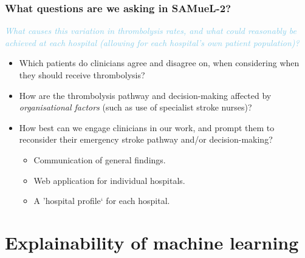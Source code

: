 \documentclass[xcolor={usenames,dvipsnames}]{beamer}
\newcommand{\smallurl}[1]{\textcolor{blue}{\fontsize{4pt}{4.8pt}\selectfont \url{#1}}}
\begin{document}
\begin{frame}
\frametitle{What questions are we asking in SAMueL-2?}


\textcolor{SkyBlue}{\emph{What causes this variation in thrombolysis rates, and what could reasonably be achieved at each hospital (allowing for each hospital's own patient population)?}}

\vspace{1em}

\begin{itemize}
    \setlength\itemsep{5mm}
    \item Which patients do clinicians agree and disagree on, when considering when they should receive thrombolysis?
    \item How are the thrombolysis pathway and decision-making affected by \emph{organisational factors} (such as use of specialist stroke nurses)?
    \item How best can we engage clinicians in our work, and prompt them to reconsider their emergency stroke pathway and/or decision-making?
    
    \begin{itemize}
        \item Communication of general findings.
        \item Web application for individual hospitals.
        \item A 'hospital profile` for each hospital.
    \end{itemize}
\end{itemize}

\end{frame}

\section{Explainability of machine learning}





\end{document}

